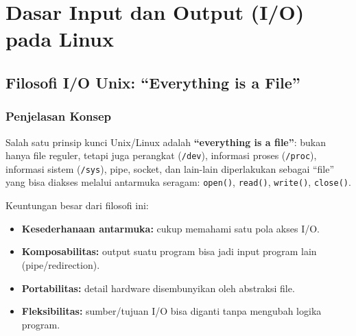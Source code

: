 
\chapter{Dasar Input dan Output (I/O) pada Linux}
\label{ch:basic-io}

\begin{abstract}
Bab ini membahas mekanisme fundamental input/output pada Linux: filosofi Unix ``everything is a file'',
file descriptor, pengalihan I/O standar (\texttt{stdin}, \texttt{stdout}, \texttt{stderr}),
pipa (pipe) dan operator \texttt{|}, pengalihan output ke file (\texttt{>}, \texttt{>>}),
serta \texttt{tee} untuk menampilkan dan menyimpan output sekaligus.
Pembahasan difokuskan untuk kebutuhan praktikum: otomasi, logging, audit sederhana, dan troubleshooting.
\end{abstract}

\section{Filosofi I/O Unix: ``Everything is a File''}
\label{sec:everything-is-file}

\subsection*{Penjelasan Konsep}
Salah satu prinsip kunci Unix/Linux adalah \textbf{``everything is a file''}:
bukan hanya file reguler, tetapi juga perangkat (\texttt{/dev}), informasi proses (\texttt{/proc}),
informasi sistem (\texttt{/sys}), pipe, socket, dan lain-lain diperlakukan sebagai ``file'' yang
bisa diakses melalui antarmuka seragam: \texttt{open()}, \texttt{read()}, \texttt{write()}, \texttt{close()}.

Keuntungan besar dari filosofi ini:
\begin{itemize}
    \item \textbf{Kesederhanaan antarmuka:} cukup memahami satu pola akses I/O.
    \item \textbf{Komposabilitas:} output suatu program bisa jadi input program lain (pipe/redirection).
    \item \textbf{Portabilitas:} detail hardware disembunyikan oleh abstraksi file.
    \item \textbf{Fleksibilitas:} sumber/tujuan I/O bisa diganti tanpa mengubah logika program.
\end{itemize}

